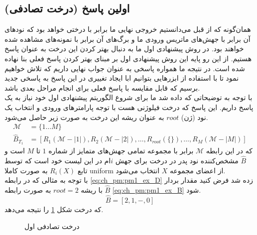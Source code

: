 \subsection{اولین پاسخ (درخت تصادفی)}
همان‌گونه که از قبل می‌دانستیم خروجی نهایی ما برابر با درختی خواهد بود که نودهای آن برابر با جهش‌های ماتریس ورودی ما و برگ‌های آن برابر با نمونه‌های مشاهده شده خواهند بود. در روش پیشنهادی اول ما به دنبال بهتر کردن این درخت به عنوان پاسخ هستیم. از این رو پایه این روش پیشنهادی اول بر مبنای بهتر کردن پاسخ فعلی بنا نهاده شده است. در نتیجه ما همواره پاسخی به عنوان جواب نهایی داریم که تلاش خواهیم نمود تا با استفاده از ابزرهایی بتوانیم ابا ایجاد تغییری در این پاسخ به پاسخی جدید برسیم که قابل مقایسه با پاسخ فعلی برای انجام مراحل بعدی باشد.
\\
 با توجه به توضیحاتی که داده شد ما برای شروع الگوریتم پیشنهادی اول خود نیاز به یک پاسخ داریم. این پاسخ که درخت فیلوژنی هست با توجه پارامترهای ورودی و انتخاب یک نود (ژن) $root$ به عنوان ریشه این درخت به صورت زیر حاصل می‌شود.
 \begin{equation}
 	\begin{aligned}
 		\mathcal{M} &= \{1\dots M\} \\
 		\hat{B}_{T_1} &= [R_1(\mathcal{M}-|1|), R_2(\mathcal{M}-|2|), \dots, R_{root}(\{\}), \dots, R_M(\mathcal{M}-|M|)] 
 	\end{aligned}
 \end{equation}
که در این رابطه $\mathcal{M}$ برابر با مجموعه تمامی جهش‌های متمایز از شماره $1$ تا  $M$ است و $\hat{B}$ مشخص‌کننده نود پدر در درخت برای جهش $i$ام در این لیست خود است که توسط تابع $R_i(X)$ به صورت کاملا \gls{uniform} از اعضای مجموعه  $X$ انتخاب می‌شود.
\\
 با توجه به مثالی که در رابطه \ref{eq:ch_pm:pm1_ex_D} زده شد فرض کنید مقدار بردار $\hat{B}$ با ریشه $root=2$ به صورت رابطه \ref{eq:ch_pm:pm1_ex_B} شود.
\begin{equation}
	\hat{B} = [2, 1, -, 0]
	\label{eq:ch_pm:pm1_ex_B}
\end{equation}
که درخت شکل \ref{fig:ch_pm:pm1_T1} را نتیجه می‌دهد.
\begin{figure}[!ht]
	\centering 
	\caption{درخت تصادفی اول}    
	\label{fig:ch_pm:pm1_T1}
\end{figure}

